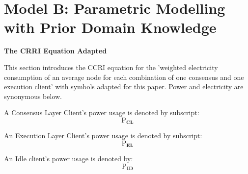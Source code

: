 \section{Model B: Parametric Modelling with Prior Domain Knowledge}



\textbf{The CRRI Equation Adapted}

This section introduces the CCRI equation for the 'weighted  electricity  consumption  of  an  average  node for each combination of one consensus and one execution client'\cite{CryptoCarbonRatingsInstitute2022TheNetwork} with symbols adapted for this paper. Power and electricity are synonymous below.

A Consensus Layer Client's power usage is denoted by subscript:
\begin{equation*}
    \boldsymbol{\mathrm{P}_{CL}}
\end{equation*}

An Execution Layer Client's power usage is denoted by subscript:
\begin{equation*}
    \boldsymbol{\mathrm{P}_{EL}}
\end{equation*}
 
 An Idle client's power usage is denoted by: \begin{equation*}
    \boldsymbol{\mathrm{P}_{ID}}
\end{equation*} 

